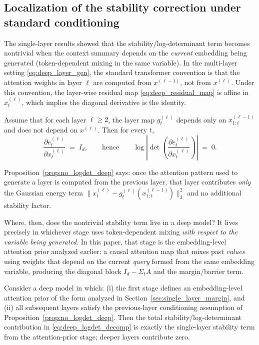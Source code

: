 \documentclass[11pt]{article}
\begin{document}
\subsection{Localization of the stability correction under standard conditioning}
\label{subsec:localization}

The single-layer results showed that the stability/log-determinant term becomes nontrivial when the
context summary depends on the \emph{current} embedding being generated (token-dependent mixing in the
same variable).
In the multi-layer setting \eqref{eq:deep_layer_gen}, the standard transformer convention is that the
attention weights in layer $\ell$ are computed from $x^{(\ell-1)}$, not from $x^{(\ell)}$.
Under this convention, the layer-wise residual map \eqref{eq:deep_residual_map} is affine in $x^{(\ell)}_t$,
which implies the diagonal derivative is the identity.

\begin{proposition}
\label{prop:no_logdet_deep}
Assume that for each layer $\ell\ge 2$, the layer map $g^{(\ell)}_t$ depends only on
$x^{(\ell-1)}_{1:t}$ and does not depend on $x^{(\ell)}$.
Then for every $t$,
\begin{equation}
\frac{\partial e^{(\ell)}_t}{\partial x^{(\ell)}_t}
\;=\;
I_d,
\qquad\text{hence}\qquad
\log\left|\det\!\left(\frac{\partial e^{(\ell)}_t}{\partial x^{(\ell)}_t}\right)\right|
\;=\;
0.
\label{eq:deep_identity_diag}
\end{equation}
\end{proposition}

Proposition~\ref{prop:no_logdet_deep} says: once the attention pattern used to generate a layer is
computed from the previous layer, that layer contributes \emph{only} the Gaussian energy term
$\|x^{(\ell)}_t-g^{(\ell)}_t(x^{(\ell-1)}_{1:t})\|_2^2$ and no additional stability factor.

Where, then, does the nontrivial stability term live in a deep model?
It lives precisely in whichever stage uses token-dependent mixing \emph{with respect to the variable
being generated}.
In this paper, that stage is the embedding-level attention prior analyzed earlier: a causal attention map
that mixes past \emph{values} using weights that depend on the current \emph{query} formed from the
same embedding variable, producing the diagonal block $I_d-\Sigma_t A$ and the margin/barrier term.

\begin{corollary}
\label{cor:localize_first}
Consider a deep model in which:
(i) the first stage defines an embedding-level attention prior of the form analyzed in
Section~\ref{sec:single_layer_margin}, and
(ii) all subsequent layers satisfy the previous-layer conditioning assumption of
Proposition~\ref{prop:no_logdet_deep}.
Then the total stability/log-determinant contribution in \eqref{eq:deep_logdet_decomp} is exactly the
single-layer stability term from the attention-prior stage; deeper layers contribute zero.
\end{corollary}
\end{document}
